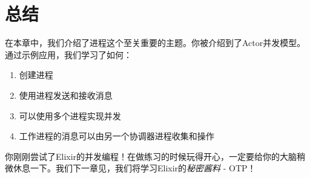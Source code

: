  \section{总结}

在本章中，我们介绍了进程这个至关重要的主题。你被介绍到了Actor并发模型。通过示例应用，我们学习了如何：

\begin{enumerate}
  \item 创建进程
  \item 使用进程发送和接收消息
  \item 可以使用多个进程实现并发
  \item 工作进程的消息可以由另一个协调器进程收集和操作
\end{enumerate}

你刚刚尝试了Elixir的并发编程！在做练习的时候玩得开心，一定要给你的大脑稍微休息一下。我们下一章见，我们将学习Elixir的\emph{秘密酱料}
- OTP！

\printnotes*